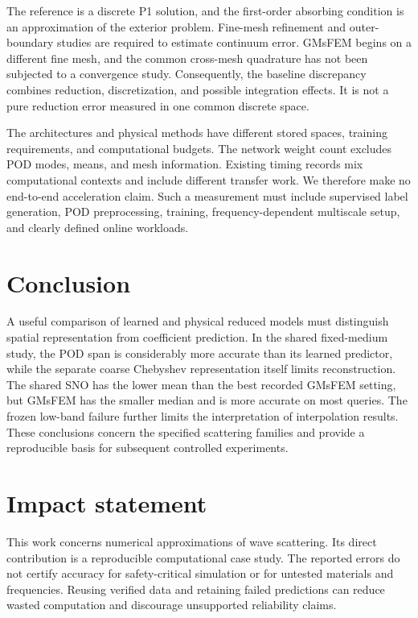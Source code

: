\documentclass{article}
\begin{document}
The reference is a discrete P1 solution, and the first-order absorbing condition is an approximation of the exterior problem. Fine-mesh refinement and outer-boundary studies are required to estimate continuum error. GMsFEM begins on a different fine mesh, and the common cross-mesh quadrature has not been subjected to a convergence study. Consequently, the baseline discrepancy combines reduction, discretization, and possible integration effects. It is not a pure reduction error measured in one common discrete space.

The architectures and physical methods have different stored spaces, training requirements, and computational budgets. The network weight count excludes POD modes, means, and mesh information. Existing timing records mix computational contexts and include different transfer work. We therefore make no end-to-end acceleration claim. Such a measurement must include supervised label generation, POD preprocessing, training, frequency-dependent multiscale setup, and clearly defined online workloads.

\section{Conclusion}
A useful comparison of learned and physical reduced models must distinguish spatial representation from coefficient prediction. In the shared fixed-medium study, the POD span is considerably more accurate than its learned predictor, while the separate coarse Chebyshev representation itself limits reconstruction. The shared SNO has the lower mean than the best recorded GMsFEM setting, but GMsFEM has the smaller median and is more accurate on most queries. The frozen low-band failure further limits the interpretation of interpolation results. These conclusions concern the specified scattering families and provide a reproducible basis for subsequent controlled experiments.

\section*{Impact statement}
This work concerns numerical approximations of wave scattering. Its direct contribution is a reproducible computational case study. The reported errors do not certify accuracy for safety-critical simulation or for untested materials and frequencies. Reusing verified data and retaining failed predictions can reduce wasted computation and discourage unsupported reliability claims.
\end{document}
